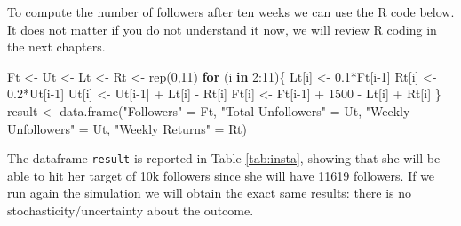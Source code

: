 \documentclass[
]{book}
\newenvironment{Shaded}{\begin{snugshade}}{\end{snugshade}}
\newcommand{\ControlFlowTok}[1]{\textcolor[rgb]{0.13,0.29,0.53}{\textbf{#1}}}
\newcommand{\DecValTok}[1]{\textcolor[rgb]{0.00,0.00,0.81}{#1}}
\newcommand{\FloatTok}[1]{\textcolor[rgb]{0.00,0.00,0.81}{#1}}
\newcommand{\FunctionTok}[1]{\textcolor[rgb]{0.00,0.00,0.00}{#1}}
\newcommand{\NormalTok}[1]{#1}
\newcommand{\OtherTok}[1]{\textcolor[rgb]{0.56,0.35,0.01}{#1}}
\newcommand{\SpecialCharTok}[1]{\textcolor[rgb]{0.00,0.00,0.00}{#1}}
\newcommand{\StringTok}[1]{\textcolor[rgb]{0.31,0.60,0.02}{#1}}
\theoremstyle{definition}
\theoremstyle{definition}
\theoremstyle{definition}
\theoremstyle{definition}
\theoremstyle{remark}
\begin{document}
To compute the number of followers after ten weeks we can use the R code below. It does not matter if you do not understand it now, we will review R coding in the next chapters.

\begin{Shaded}
\begin{Highlighting}[]
\NormalTok{Ft }\OtherTok{\textless{}{-}}\NormalTok{ Ut }\OtherTok{\textless{}{-}}\NormalTok{ Lt }\OtherTok{\textless{}{-}}\NormalTok{ Rt }\OtherTok{\textless{}{-}} \FunctionTok{rep}\NormalTok{(}\DecValTok{0}\NormalTok{,}\DecValTok{11}\NormalTok{)}
\ControlFlowTok{for}\NormalTok{ (i }\ControlFlowTok{in} \DecValTok{2}\SpecialCharTok{:}\DecValTok{11}\NormalTok{)\{}
\NormalTok{  Lt[i] }\OtherTok{\textless{}{-}} \FloatTok{0.1}\SpecialCharTok{*}\NormalTok{Ft[i}\DecValTok{{-}1}\NormalTok{]}
\NormalTok{  Rt[i] }\OtherTok{\textless{}{-}} \FloatTok{0.2}\SpecialCharTok{*}\NormalTok{Ut[i}\DecValTok{{-}1}\NormalTok{]}
\NormalTok{  Ut[i] }\OtherTok{\textless{}{-}}\NormalTok{ Ut[i}\DecValTok{{-}1}\NormalTok{] }\SpecialCharTok{+}\NormalTok{ Lt[i] }\SpecialCharTok{{-}}\NormalTok{ Rt[i]}
\NormalTok{  Ft[i] }\OtherTok{\textless{}{-}}\NormalTok{ Ft[i}\DecValTok{{-}1}\NormalTok{] }\SpecialCharTok{+} \DecValTok{1500} \SpecialCharTok{{-}}\NormalTok{ Lt[i] }\SpecialCharTok{+}\NormalTok{ Rt[i]}
\NormalTok{\}}
\NormalTok{result }\OtherTok{\textless{}{-}} \FunctionTok{data.frame}\NormalTok{(}\StringTok{"Followers"} \OtherTok{=}\NormalTok{ Ft, }\StringTok{"Total Unfollowers"} \OtherTok{=}\NormalTok{ Ut,}
           \StringTok{"Weekly Unfollowers"} \OtherTok{=}\NormalTok{ Ut, }\StringTok{"Weekly Returns"} \OtherTok{=}\NormalTok{ Rt)}
\end{Highlighting}
\end{Shaded}

The dataframe \texttt{result} is reported in Table \ref{tab:insta}, showing that she will be able to hit her target of 10k followers since she will have 11619 followers. If we run again the simulation we will obtain the exact same results: there is no stochasticity/uncertainty about the outcome.
\end{document}
